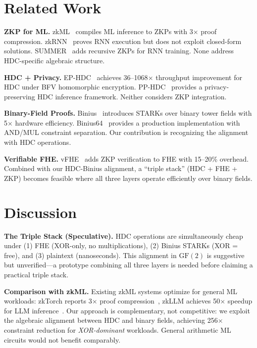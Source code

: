 \documentclass[11pt,twocolumn]{article}
\begin{document}
\section{Related Work}

\textbf{ZKP for ML.} zkML~\cite{zkml2024} compiles ML inference to ZKPs with 3$\times$ proof compression. zkRNN~\cite{zkrnn2026} proves RNN execution but does not exploit closed-form solutions. SUMMER~\cite{summer2025} adds recursive ZKPs for RNN training. None address HDC-specific algebraic structure.

\textbf{HDC + Privacy.} EP-HDC~\cite{ephdc2025} achieves 36--1068$\times$ throughput improvement for HDC under BFV homomorphic encryption. PP-HDC~\cite{pphdc2024} provides a privacy-preserving HDC inference framework. Neither considers ZKP integration.

\textbf{Binary-Field Proofs.} Binius~\cite{diamond2023binius} introduces STARKs over binary tower fields with 5$\times$ hardware efficiency. Binius64~\cite{binius64} provides a production implementation with AND/MUL constraint separation. Our contribution is recognizing the alignment with HDC operations.

\textbf{Verifiable FHE.} vFHE~\cite{vfhe2023} adds ZKP verification to FHE with 15--20\% overhead. Combined with our HDC-Binius alignment, a ``triple stack'' (HDC + FHE + ZKP) becomes feasible where all three layers operate efficiently over binary fields.

\section{Discussion}

\textbf{The Triple Stack (Speculative).} HDC operations are simultaneously cheap under (1) FHE (XOR-only, no multiplications), (2) Binius STARKs (XOR = free), and (3) plaintext (nanoseconds). This alignment in $\mathrm{GF}(2)$ is suggestive but unverified---a prototype combining all three layers is needed before claiming a practical triple stack.

\textbf{Comparison with zkML.} Existing zkML systems optimize for general ML workloads: zkTorch reports 3$\times$ proof compression~\cite{zkml2024}, zkLLM achieves 50$\times$ speedup for LLM inference~\cite{zkllm}. Our approach is complementary, not competitive: we exploit the algebraic alignment between HDC and binary fields, achieving 256$\times$ constraint reduction for \emph{XOR-dominant} workloads. General arithmetic ML circuits would not benefit comparably.
\end{document}
